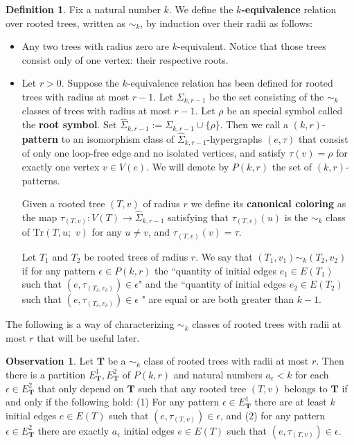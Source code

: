 \documentclass[12pt,notitlepage,a4paper]{article}
\theoremstyle{definition}
\newtheorem{obs}{Observation}[section]
\newtheorem{definition}{Definition}[section]
\begin{document}
\begin{definition}
	
	Fix a natural number $k$. We define the
	\textbf{$k$-equivalence} relation over rooted trees, 
	written as $\sim_k$, by induction over their radii as follows:
	
	\begin{itemize}[leftmargin=*]
		\item Any two trees with radius zero are $k$-equivalent.
		Notice that those trees
		consist only of one vertex: their respective roots.
		
		\item Let $r>0$.
		Suppose the $k$-equivalence relation has been
		defined for rooted trees with radius at most $r-1$. Let $\Sigma_{k,r-1}$
		be the set consisting of the $\sim_k$ classes of trees
		with radius at most $r-1$. Let $\rho$ be an special symbol called the
		\textbf{root symbol}. Set $\widehat{\Sigma}_{k,r-1}:=\Sigma_{k,r-1}\cup \{\rho\}$.
		Then we call a $(k,r)$-\textbf{pattern} to an isomorphism class
		of $\widehat{\Sigma}_{k,r-1}$-hypergraphs 
		$(e,\tau)$ that consist of only one loop-free edge and no isolated vertices,
		and satisfy 
		$\tau(v)=\rho$ for exactly one vertex $v\in V(e)$. We will
		denote by $P(k,r)$ the set of $(k,r)$-patterns. \par
		Given a rooted tree $(T,v)$ of radius $r$
		we define its \textbf{canonical coloring}
		as the map 
		$\tau_{(T,v)}: V(T)\rightarrow \widehat{\Sigma}_{k,r-1}$ satisfying that
		$\tau_{(T,v)}(u)$ is the
		$\sim_k$ class of $\mathrm{Tr}(T,u;\, \,v)$
		for any $u\neq v$, and $\tau_{(T,v)}(v)=\tau$. \par
		Let $T_1$ and $T_2$ be rooted trees of radius $r$. 
		We say that $(T_1,v_1)\sim_k (T_2,v_2)$ 
		if for any pattern $\epsilon\in P(k,r)$	the
		``quantity of initial edges $e_1\in E(T_1)$ such that
		$\left(e,\tau_{(T_\delta,v_\delta)}\right) \in \epsilon$" 
		and the
		``quantity of initial edges $e_2\in E(T_2)$ such that
		$\left(e,\tau_{(T_\delta,v_\delta)}\right)\in \epsilon$
		" are equal or
		are both greater than $k-1$.
	\end{itemize}
	
\end{definition}

The following is a way of characterizing $\sim_k$ classes
of rooted trees with radii at most $r$ that will be useful later. 

\begin{obs}\label{obs:equivalenttrees}
	Let $\mathbf{T}$ be a $\sim_k$ class of rooted trees with
	radii at most $r$. Then there is a partition $E^1_\mathbf{T},
	E^2_\mathbf{T}$ of $P(k,r)$ and natural numbers $a_\epsilon<k$
	for each $\epsilon\in E^2_\mathbf{T}$ that only depend on 
	$\mathbf{T}$ such that any rooted tree $(T,v)$ belongs to
	$\mathbf{T}$ if and only if the following hold: (1) For any pattern 
	$\epsilon\in E^1_\mathbf{T}$ there are at least $k$ initial edges $e\in E(T)$ such that
	$(e,\tau_{(T,v)})\in \epsilon$, and (2) for any pattern 
	$\epsilon\in E^2_\mathbf{T}$ there are exactly
	$a_\epsilon$ initial edges $e\in E(T)$ such that
	$(e,\tau_{(T,v)})\in \epsilon$.	
\end{obs}
\end{document}
